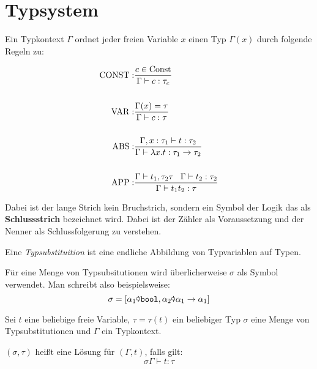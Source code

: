 \section{Typsystem}
\begin{definition}\label{def:typsystem-t1}%
	Ein Typkontext $\Gamma$ ordnet jeder freien Variable $x$ einen Typ $\Gamma(x)$
	durch folgende Regeln zu:

	\begin{align*}
		\operatorname{CONST}:&\frac{c \in \text{Const}}{\Gamma \vdash c: \tau_c}\\
			   &\\
		\operatorname{VAR}:  &\frac{\Gamma(x) = \tau}{\Gamma \vdash c: \tau}\\
			   &\\
		\operatorname{ABS}:  &\frac{\Gamma, x: \tau_1 \vdash t: \tau_2}{\Gamma \vdash \lambda x. t: \tau_1 \rightarrow \tau_2}\\
			   &\\
		\operatorname{APP}:  &\frac{\Gamma \vdash t_1, \tau_2 \tau\;\;\; \Gamma \vdash t_2: \tau_2}{\Gamma \vdash t_1 t_2: \tau}
	\end{align*}
\end{definition}


Dabei ist der lange Strich kein Bruchstrich, sondern ein Symbol der Logik das als
\textbf{Schlussstrich} bezeichnet wird. Dabei ist der 
Zähler als Voraussetzung und der Nenner als Schlussfolgerung zu verstehen.

\begin{definition}[Typsubstituition]%
	Eine \textit{Typsubstituition} ist eine endliche Abbildung von Typvariablen auf
	Typen.
\end{definition}

Für eine Menge von Typsubsitutionen wird überlicherweise $\sigma$ als Symbol
verwendet. Man schreibt also beispielsweise:
\[\sigma = [\alpha_1 \text{\pointer} \text{\texttt{bool}}, \alpha_2 \text{\pointer} \alpha_1 \rightarrow \alpha_1]\]

\begin{definition}
	Sei $t$ eine beliebige freie Variable, $\tau = \tau(t)$ ein beliebiger Typ
	$\sigma$ eine Menge von Typsubstitutionen und $\Gamma$ ein Typkontext.

	$(\sigma, \tau)$ heißt eine Lösung für $(\Gamma, t)$, falls gilt:
	\[\sigma \Gamma \vdash t : \tau\]
\end{definition}

